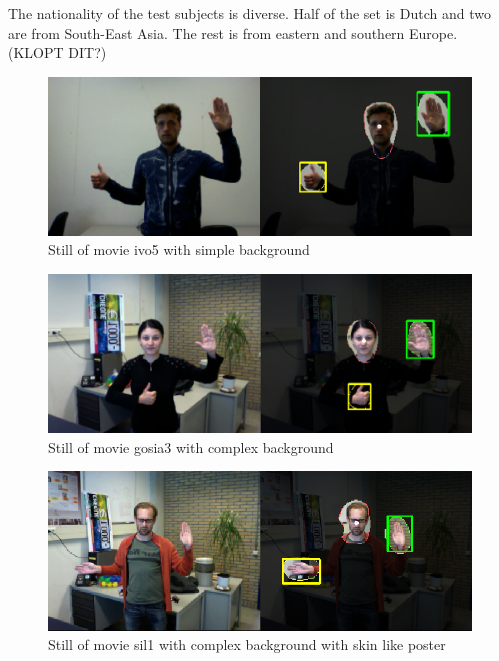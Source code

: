 The nationality of the test subjects is diverse. Half of the set is Dutch and two are from South-East Asia. The rest is from eastern and southern Europe. (KLOPT DIT?)

\begin{figure}[htbp]
\center{}
\includegraphics[width=0.8\linewidth]{figures/simple.png}
\caption{Still of movie ivo5 with simple background}
\label{fig:simplebackground}
\end{figure}

\begin{figure}[htbp]
\center{}
\includegraphics[width=0.8\linewidth]{figures/complex.png}
\caption{Still of movie gosia3 with complex background}
\label{fig:complexbackground}
\end{figure}

\begin{figure}[htbp]
\center{}
\includegraphics[width=0.8\linewidth]{figures/complexposter.png}
\caption{Still of movie sil1 with complex background with skin like poster}
\label{fig:complexposterbackground}
\end{figure}


